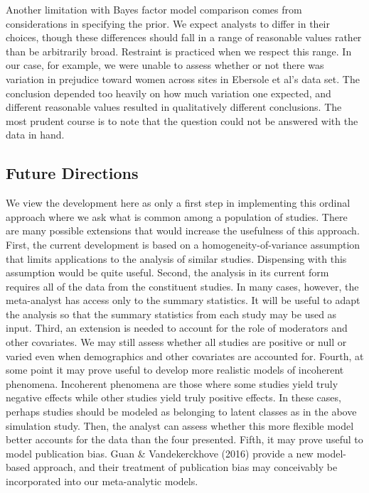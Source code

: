 \documentclass[english,man]{apa6}
\theoremstyle{definition}
\theoremstyle{definition}
\theoremstyle{remark}
\begin{document}
Another limitation with Bayes factor model comparison comes from
considerations in specifying the prior. We expect analysts to differ in
their choices, though these differences should fall in a range of
reasonable values rather than be arbitrarily broad. Restraint is
practiced when we respect this range. In our case, for example, we were
unable to assess whether or not there was variation in prejudice toward
women across sites in Ebersole et al's data set. The conclusion depended
too heavily on how much variation one expected, and different reasonable
values resulted in qualitatively different conclusions. The most prudent
course is to note that the question could not be answered with the data
in hand.

\subsection{Future Directions}\label{future-directions}

We view the development here as only a first step in implementing this
ordinal approach where we ask what is common among a population of
studies. There are many possible extensions that would increase the
usefulness of this approach. First, the current development is based on
a homogeneity-of-variance assumption that limits applications to the
analysis of similar studies. Dispensing with this assumption would be
quite useful. Second, the analysis in its current form requires all of
the data from the constituent studies. In many cases, however, the
meta-analyst has access only to the summary statistics. It will be
useful to adapt the analysis so that the summary statistics from each
study may be used as input. Third, an extension is needed to account for
the role of moderators and other covariates. We may still assess whether
all studies are positive or null or varied even when demographics and
other covariates are accounted for. Fourth, at some point it may prove
useful to develop more realistic models of incoherent phenomena.
Incoherent phenomena are those where some studies yield truly negative
effects while other studies yield truly positive effects. In these
cases, perhaps studies should be modeled as belonging to latent classes
as in the above simulation study. Then, the analyst can assess whether
this more flexible model better accounts for the data than the four
presented. Fifth, it may prove useful to model publication bias. Guan \&
Vandekerckhove (2016) provide a new model-based approach, and their
treatment of publication bias may conceivably be incorporated into our
meta-analytic models.
\end{document}
